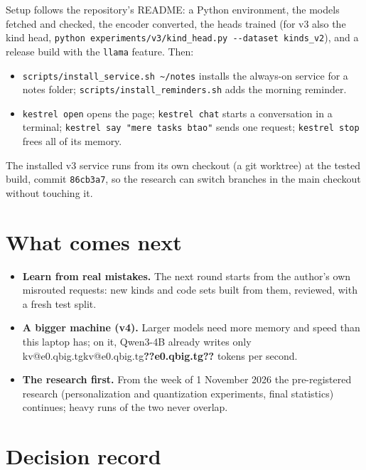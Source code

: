 \documentclass[11pt,a4paper]{article}
\makeatletter
\DeclareRobustCommand{\kv}[1]{\ifcsname kv@#1\endcsname\csname kv@#1\endcsname\else\textbf{??#1??}\fi}
\makeatother
\begin{document}
Setup follows the repository's README: a Python environment, the models fetched and checked, the encoder converted,
the heads trained (for v3 also the kind head, \texttt{python experiments/v3/kind\_head.py -{}-dataset kinds\_v2}), and a
release build with the \texttt{llama} feature. Then:
\begin{itemize}
  \item \texttt{scripts/install\_service.sh \textasciitilde/notes} installs the always-on service for a notes folder;
  \texttt{scripts/install\_reminders.sh} adds the morning reminder.
  \item \texttt{kestrel open} opens the page; \texttt{kestrel chat} starts a conversation in a terminal;
  \texttt{kestrel say "mere tasks btao"} sends one request; \texttt{kestrel stop} frees all of its memory.
\end{itemize}
The installed v3 service runs from its own checkout (a git worktree) at the tested build, commit \texttt{86cb3a7},
so the research can switch branches in the main checkout without touching it.

\section{What comes next}

\begin{itemize}
  \item \textbf{Learn from real mistakes.} The next round starts from the author's own misrouted requests: new kinds and
  code sets built from them, reviewed, with a fresh test split.
  \item \textbf{A bigger machine (v4).} Larger models need more memory and speed than this laptop has; on it, Qwen3-4B
  already writes only \kv{e0.qbig.tg} tokens per second.
  \item \textbf{The research first.} From the week of 1 November 2026 the pre-registered research (personalization and
  quantization experiments, final statistics) continues; heavy runs of the two never overlap.
\end{itemize}

\appendix
\section{Decision record}\label{app:decisions}
\end{document}
